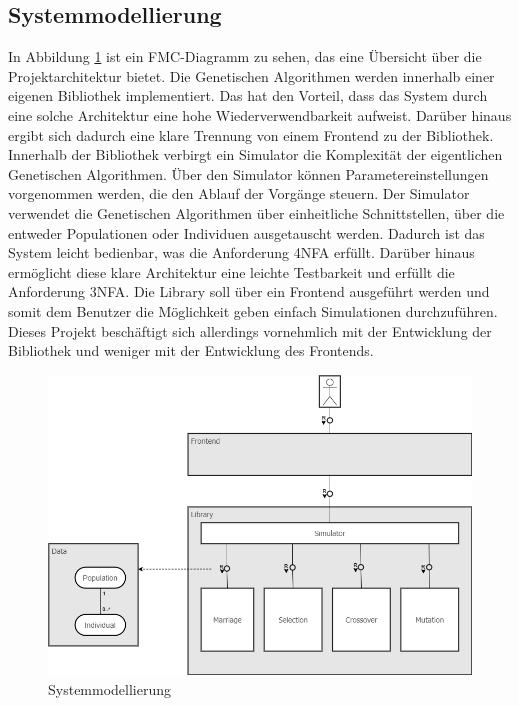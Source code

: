 \subsection{Systemmodellierung}
In Abbildung \ref{fig:systemmodellierung} ist ein FMC-Diagramm zu sehen, das eine Übersicht über die Projektarchitektur bietet.
Die Genetischen Algorithmen werden innerhalb einer eigenen Bibliothek implementiert. Das hat den Vorteil, dass das System durch eine solche Architektur eine hohe Wiederverwendbarkeit aufweist. Darüber hinaus ergibt sich dadurch eine klare Trennung von einem Frontend zu der Bibliothek.
Innerhalb der Bibliothek verbirgt ein Simulator die Komplexität der eigentlichen Genetischen Algorithmen. Über den Simulator können Parametereinstellungen vorgenommen werden, die den Ablauf der Vorgänge steuern.
Der Simulator verwendet die Genetischen Algorithmen über einheitliche Schnittstellen, über die entweder Populationen oder Individuen ausgetauscht werden. Dadurch ist das System leicht bedienbar, was die Anforderung 4NFA erfüllt. Darüber hinaus ermöglicht diese klare Architektur eine leichte Testbarkeit und erfüllt die Anforderung 3NFA. Die Library soll über ein Frontend ausgeführt werden und somit dem Benutzer die Möglichkeit geben einfach Simulationen durchzuführen. Dieses Projekt beschäftigt sich allerdings vornehmlich mit der Entwicklung der Bibliothek und weniger mit der Entwicklung des Frontends.

\begin{figure}[H]
\centering
\includegraphics[width=1\textwidth]{img/Vortrag/Systemmodellierung.png}
\caption{Systemmodellierung}
\label{fig:systemmodellierung}
\end{figure}

